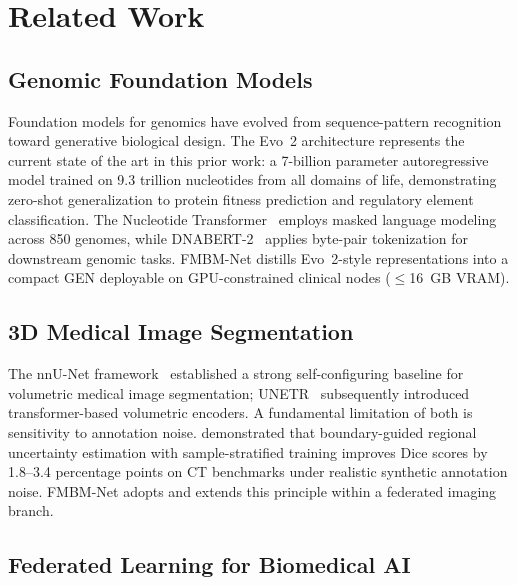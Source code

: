 \documentclass{ieeeaccess}
\begin{document}
\section{Related Work}
\label{sec:related}

\subsection{Genomic Foundation Models}

Foundation models for genomics have evolved from sequence-pattern recognition
toward generative biological design. The Evo~2 architecture \cite{evo2_2026}
represents the current state of the art in this prior work: a 7-billion
parameter autoregressive model trained on 9.3 trillion nucleotides from all
domains of life, demonstrating zero-shot generalization to protein fitness
prediction and regulatory element classification. The Nucleotide
Transformer~\cite{nucleotide_transformer_2023} employs masked language
modeling across 850 genomes, while DNABERT-2~\cite{zhou2024dnabert2} applies
byte-pair tokenization for downstream genomic tasks. FMBM-Net distills
Evo~2-style representations into a compact GEN deployable on GPU-constrained
clinical nodes ($\leq$16~GB VRAM).

\subsection{3D Medical Image Segmentation}

The nnU-Net framework~\cite{isensee2021nnunet} established a strong
self-configuring baseline for volumetric medical image segmentation;
UNETR~\cite{hatamizadeh2022unetr} subsequently introduced transformer-based
volumetric encoders. A fundamental limitation of both is sensitivity to
annotation noise. \cite{rue_ct_2025} demonstrated that boundary-guided
regional uncertainty estimation with sample-stratified training improves
Dice scores by 1.8--3.4 percentage points on CT benchmarks under realistic
synthetic annotation noise. FMBM-Net adopts and extends this principle within
a federated imaging branch.

\subsection{Federated Learning for Biomedical AI}
\end{document}
